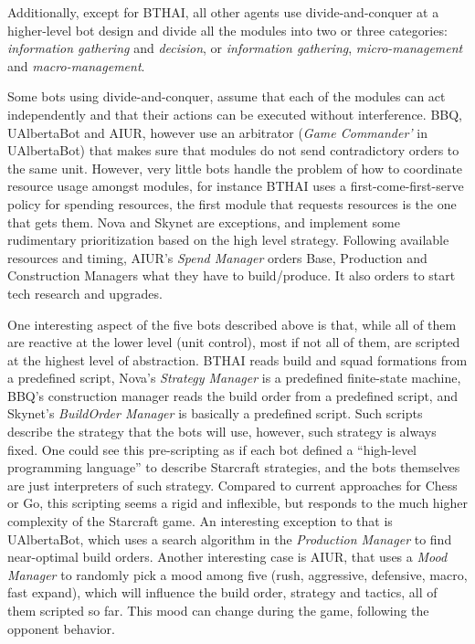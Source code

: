 \documentclass[journal]{IEEEtran}
\begin{document}
Additionally, except for BTHAI, all other agents use divide-and-conquer at a higher-level bot design and divide all the modules into two or three categories: {\em information gathering} and {\em decision}, or {\em information gathering}, {\em micro-management} and {\em macro-management}.

Some bots using divide-and-conquer, assume that each of the modules can act independently and that their actions can be executed without interference. BBQ, UAlbertaBot and AIUR, however use an arbitrator ({\em Game Commander'} in UAlbertaBot) that makes sure that modules do not send contradictory orders to the same unit. However, very little bots handle the problem of how to coordinate resource usage amongst modules, for instance BTHAI uses a first-come-first-serve policy for spending resources, the first module that requests resources is the one that gets them. Nova and Skynet are exceptions, and implement some rudimentary prioritization based on the high level strategy. Following available resources and timing, AIUR's {\em Spend Manager} orders Base, Production and Construction Managers what they have to build/produce. It also orders to start tech research and upgrades.

One interesting aspect of the five bots described above is that, while all of them are reactive at the lower level (unit control), most if not all of them, are scripted at the highest level of abstraction. BTHAI reads build and squad formations from a predefined script, Nova's {\em Strategy Manager} is a predefined finite-state machine, BBQ's construction manager reads the build order from a predefined script, and Skynet's {\em BuildOrder Manager} is basically a predefined script. Such scripts describe the strategy that the bots will use, however, such strategy is always fixed. One could see this pre-scripting as if each bot defined a ``high-level programming language'' to describe Starcraft strategies, and the bots themselves are just interpreters of such strategy. Compared to current approaches for Chess or Go, this scripting seems a rigid and inflexible, but responds to the much higher complexity of the Starcraft game. An interesting exception to that is UAlbertaBot, which uses a search algorithm in the {\em Production Manager} to find near-optimal build orders. Another interesting case is AIUR, that uses a {\em Mood Manager} to randomly pick a mood among five (rush, aggressive, defensive, macro, fast expand), which will influence the build order, strategy and tactics, all of them scripted so far. This mood can change during the game, following the opponent behavior.
\end{document}
